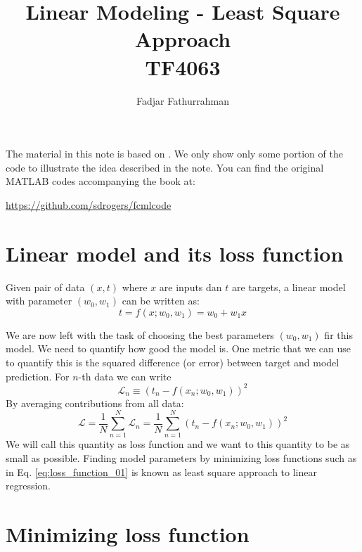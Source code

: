 \documentclass[b5paper,12pt]{article} %
\begin{document}


\title{Linear Modeling - Least Square Approach\\
TF4063}
\author{Fadjar Fathurrahman}
\date{}
\maketitle

The material in this note is based on \cite{Rogers2017}.
We only show only some portion of the code to illustrate the idea described in the
note. You can find the original MATLAB codes accompanying the book at:

{\footnotesize
\url{https://github.com/sdrogers/fcmlcode}
}

\section{Linear model and its loss function}

Given pair of data $(x,t)$ where $x$ are inputs dan $t$
are targets, a linear model with parameter $(w_0, w_1)$ can
be written as:
\begin{equation}
t = f(x; w_0, w_1) = w_0 + w_1 x
\label{eq:model_linear_01}
\end{equation}

We are now left with the task of choosing the best parameters $(w_0, w_1)$
fir this model.
We need to quantify how good the model is.
One metric that we can use to quantify this is the squared difference (or
error) between target and model prediction. For $n$-th data we can write
\begin{equation}
\mathcal{L}_n \equiv \left( t_n - f(x_n; w_0, w_1) \right)^2
\end{equation}
%
By averaging contributions from all data:
\begin{equation}
\mathcal{L} = \frac{1}{N} \sum_{n=1}^{N} \mathcal{L}_n =
\frac{1}{N} \sum_{n=1}^{N} \left( t_n - f(x_n; w_0, w_1) \right)^2
\label{eq:loss_function_01}
\end{equation}
We will call this quantity as loss function
and we want to this quantity to be as small as possible.
Finding model parameters by minimizing loss functions such as
in Eq. \eqref{eq:loss_function_01}
is known as least square approach to linear regression.


\section{Minimizing loss function}
\end{document}
